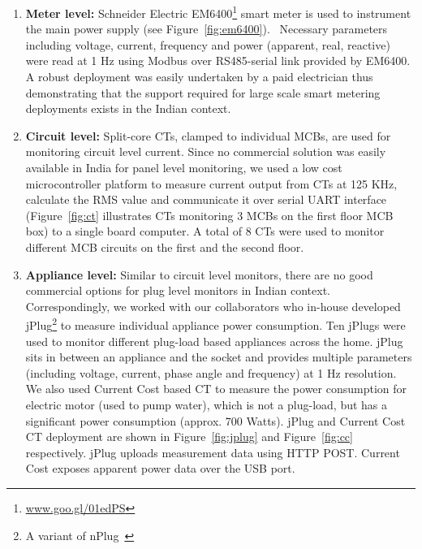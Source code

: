 \documentclass[10pt]{sensys-proc}
\newcommand{\figref}[1]{Figure~\ref{#1}}
\newcommand{\denselistbib}{
  \itemsep -.6pt\topsep-4pt\partopsep-20pt
}
\begin{document}
\begin{enumerate}\denselistbib
\item \textbf{Meter level:} Schneider Electric EM6400\footnote{\url{www.goo.gl/01edPS}} smart meter is used to instrument the main power supply (see \figref{fig:em6400}).%
~Necessary parameters including voltage, current, frequency and power (apparent, real, reactive) were read at 1 Hz using Modbus over RS485-serial link provided by EM6400. A robust deployment was easily undertaken by a paid electrician thus demonstrating that the support required for large scale smart metering deployments exists in the Indian context. 

\item \textbf{Circuit level:} Split-core CTs, clamped to individual MCBs, are used for monitoring circuit level current. Since no commercial solution was easily available in India for panel level monitoring, we used a low cost microcontroller platform to measure current output from CTs at 125 KHz, calculate the RMS value and communicate it over serial UART interface (\figref{fig:ct} illustrates CTs monitoring 3 MCBs on the first floor MCB box) to a single board computer. A total of 8 CTs were used to monitor different MCB circuits on the first and the second floor.

\item \textbf{Appliance level:} Similar to circuit level monitors, there are no good commercial options for plug level monitors in Indian context. Correspondingly, we worked with our collaborators who in-house developed jPlug\footnote{A variant of nPlug~\cite{nplug}} to measure individual appliance power consumption. Ten jPlugs were used to monitor different plug-load based appliances across the home. jPlug sits in between an appliance and the socket and provides multiple parameters (including voltage, current, phase angle and frequency) at 1 Hz resolution. We also used Current Cost based CT to measure the power consumption for electric motor (used to pump water), which is not a plug-load, but has a significant power consumption (approx. 700 Watts). jPlug and Current Cost CT deployment are shown in \figref{fig:jplug} and \figref{fig:cc} respectively. jPlug uploads measurement data using HTTP POST. Current Cost exposes apparent power data over the USB port. 
\end{enumerate}
\end{document}
